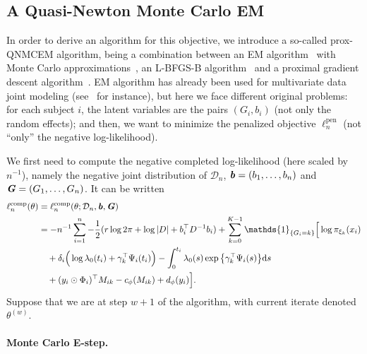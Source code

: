 \documentclass[11pt]{article}
\newcommand{\dd}{\mathrm{d}}
\newcommand{\ind}[1]{\mathds{1}_{#1}}
\newcommand{\cD}{\mathcal D}
\begin{document}
\subsection{A Quasi-Newton Monte Carlo EM}
\label{sec:prox-QNMCEM}

In order to derive an algorithm for this objective, we introduce a so-called prox-QNMCEM algorithm, being a combination between an EM algorithm~\citep{dempster1977maximum} with Monte Carlo approximations~\citep{levine2001implementations}, an L-BFGS-B algorithm~\citep{zhu1997algorithm} and a proximal gradient descent algorithm~\citep{beck2009fast}. EM algorithm has already been used for multivariate data joint modeling (see~\citet{lin2002maximum} for instance), but here we face different original problems: for each subject $i$, the latent variables are the pairs $(G_i, b_i)$ (not only the random effects); and then, we want to minimize the penalized objective $\ell_n^\text{pen}$ (not ``only'' the negative log-likelihood).

We first need to compute the negative completed log-likelihood (here scaled by $n^{-1}$), namely the negative joint distribution of $\cD_n$, $\textbf{\textit{b}} = (b_1, \ldots, b_n)$ and $\textbf{\textit{G}} = (G_1, \ldots, G_n)$.
It can be written
\begin{align*}
  \ell_n^\text{comp}(\theta) &= \ell_n^\text{comp}(\theta ; \cD_n, \textbf{\textit{b}}, \textbf{\textit{G}}) \\ 
  &= - n^{-1} \sum_{i=1}^n -\dfrac12 (r \log 2\pi + \log|D| + b_i^\top D^{-1}b_i) + \sum_{k=0}^{K-1} \ind{\{G_i=k\}} \Big[ \log \pi_{\xi_k}(x_i) \\ 
  & \quad + \delta_i \Big(\log \lambda_0(t_i) + \gamma_k^\top \Psi_i(t_i) \Big) - \int_0^{t_i} \lambda_0(s) \exp \big\{ \gamma_k^\top \Psi_i(s) \big\} \dd s \\
  & \quad + (y_i \odot \Phi_i)^\top M_{ik} - c_\phi(M_{ik}) + d_\phi(y_i) \Big].
\end{align*}
Suppose that we are at step $w + 1$ of the algorithm, with current iterate denoted $\theta^{(w)}$. 

\paragraph*{Monte Carlo E-step.}
\end{document}
